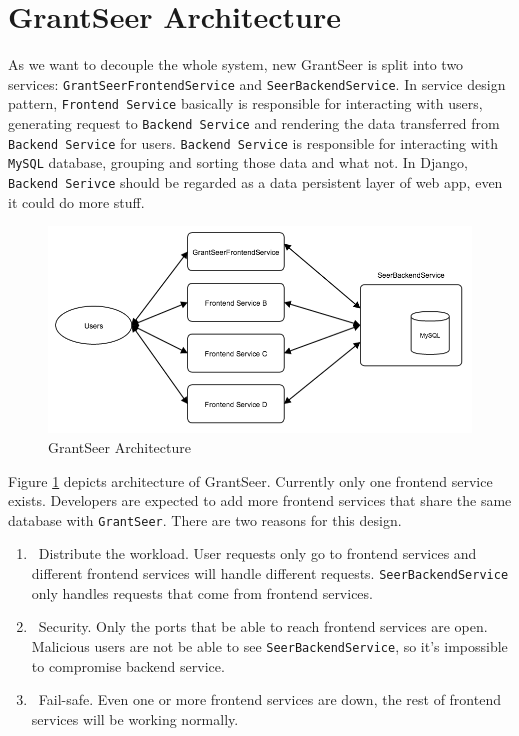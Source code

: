 \documentclass[12pt]{article}
\begin{document}
\section{GrantSeer Architecture}
As we want to decouple the whole system, new GrantSeer is split into two services: \texttt{GrantSeerFrontendService} and \texttt{SeerBackendService}. In service design pattern, \texttt{Frontend Service} basically is responsible for interacting with users, generating request to \texttt{Backend Service} and rendering the data transferred from \texttt{Backend Service} for users. \texttt{Backend Service} is responsible for interacting with \texttt{MySQL} database, grouping and sorting those data and what not. In Django, \texttt{Backend Serivce} should be regarded as a data persistent layer of web app, even it could do more stuff.

\begin{figure}[!htb]
	\caption{GrantSeer Architecture}
	\label{grantseer_architecture}
	\centering
	\includegraphics[width=\textwidth]{GrantSeerArchitecture.png}
\end{figure}

Figure \ref{grantseer_architecture} depicts architecture of GrantSeer. Currently only one frontend service exists. Developers are expected to add more frontend services that share the same database with \texttt{GrantSeer}. There are two reasons for this design.
\begin{enumerate}
	\item\ Distribute the workload. User requests only go to frontend services and different frontend services will handle different requests. \texttt{SeerBackendService} only handles requests that come from frontend services.
	\item\ Security. Only the ports that be able to reach frontend services are open. Malicious users are not be able to see \texttt{SeerBackendService}, so it's impossible to compromise backend service.
	\item\ Fail-safe. Even one or more frontend services are down, the rest of frontend services will be working normally.
\end{enumerate}
\end{document}

